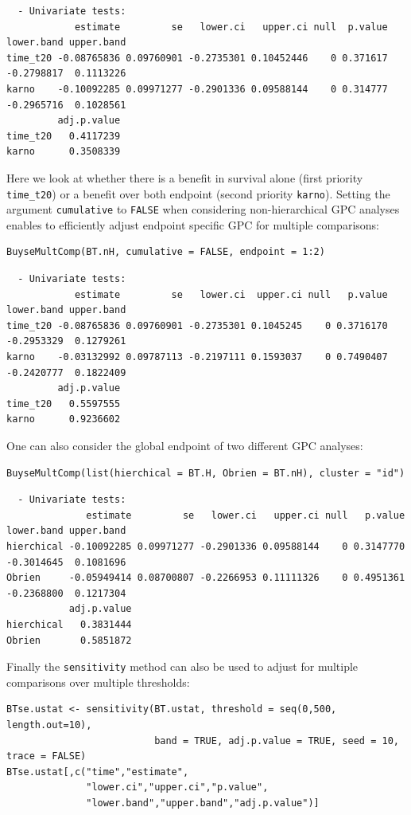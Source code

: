 \documentclass[12pt]{article}
\begin{document}
\begin{verbatim}
  - Univariate tests:
            estimate         se   lower.ci   upper.ci null  p.value lower.band upper.band
time_t20 -0.08765836 0.09760901 -0.2735301 0.10452446    0 0.371617 -0.2798817  0.1113226
karno    -0.10092285 0.09971277 -0.2901336 0.09588144    0 0.314777 -0.2965716  0.1028561
         adj.p.value
time_t20   0.4117239
karno      0.3508339
\end{verbatim}


Here we look at whether there is a benefit in survival alone (first
priority \texttt{time\_t20}) or a benefit over both endpoint (second priority
\texttt{karno}). Setting the argument \texttt{cumulative} to \texttt{FALSE} when
considering non-hierarchical GPC analyses enables to efficiently
adjust endpoint specific GPC for multiple comparisons:
\lstset{language=r,label= ,caption= ,captionpos=b,numbers=none}
\begin{lstlisting}
BuyseMultComp(BT.nH, cumulative = FALSE, endpoint = 1:2)
\end{lstlisting}

\begin{verbatim}
  - Univariate tests:
            estimate         se   lower.ci  upper.ci null   p.value lower.band upper.band
time_t20 -0.08765836 0.09760901 -0.2735301 0.1045245    0 0.3716170 -0.2953329  0.1279261
karno    -0.03132992 0.09787113 -0.2197111 0.1593037    0 0.7490407 -0.2420777  0.1822409
         adj.p.value
time_t20   0.5597555
karno      0.9236602
\end{verbatim}


One can also consider the global endpoint of two different GPC analyses:
\lstset{language=r,label= ,caption= ,captionpos=b,numbers=none}
\begin{lstlisting}
BuyseMultComp(list(hierchical = BT.H, Obrien = BT.nH), cluster = "id")
\end{lstlisting}

\begin{verbatim}
  - Univariate tests:
              estimate         se   lower.ci   upper.ci null   p.value lower.band upper.band
hierchical -0.10092285 0.09971277 -0.2901336 0.09588144    0 0.3147770 -0.3014645  0.1081696
Obrien     -0.05949414 0.08700807 -0.2266953 0.11111326    0 0.4951361 -0.2368800  0.1217304
           adj.p.value
hierchical   0.3831444
Obrien       0.5851872
\end{verbatim}


Finally the \texttt{sensitivity} method can also be used to adjust for
multiple comparisons over multiple thresholds:
\lstset{language=r,label= ,caption= ,captionpos=b,numbers=none}
\begin{lstlisting}
BTse.ustat <- sensitivity(BT.ustat, threshold = seq(0,500, length.out=10),
                          band = TRUE, adj.p.value = TRUE, seed = 10, trace = FALSE)
BTse.ustat[,c("time","estimate",
              "lower.ci","upper.ci","p.value",
              "lower.band","upper.band","adj.p.value")]
\end{lstlisting}
\end{document}
